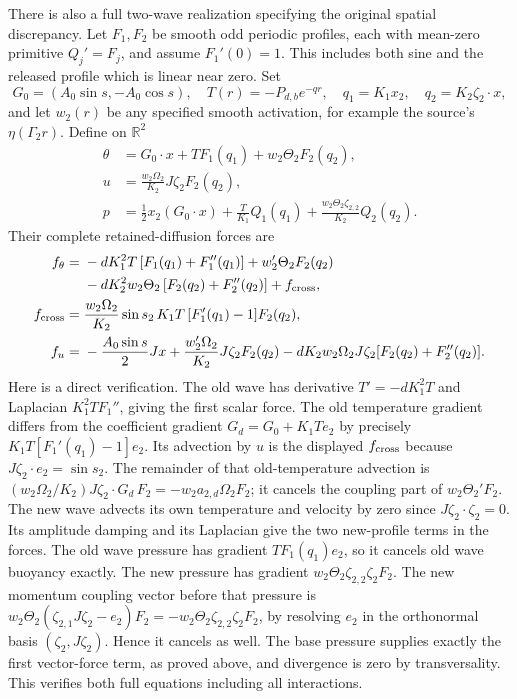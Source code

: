 There is also a full two-wave realization specifying the original
spatial discrepancy. Let $F_1,F_2$ be smooth odd periodic profiles,
each with mean-zero primitive $Q_j'=F_j$, and assume $F_1'(0)=1$.
This includes both sine and the released profile which is linear
near zero. Set
\[
 G_0=(A_0\sin s,-A_0\cos s),\quad
 T(r)=-P_{d,b}e^{-qr},\quad
 q_1=K_1x_2,\quad q_2=K_2\zeta_2\cdot x,
\]
and let $w_2(r)$ be any specified smooth activation, for example
the source's $\eta(\Gamma_2r)$. Define on $\mathbb R^2$
\begin{align}
 \theta&=G_0\cdot x+T F_1(q_1)+w_2\Theta_2F_2(q_2),\nonumber\\
 u&=\frac{w_2\Omega_2}{K_2}J\zeta_2F_2(q_2),\nonumber\\
 p&=\frac12x_2(G_0\cdot x)+\frac{T}{K_1}Q_1(q_1)
          +\frac{w_2\Theta_2\zeta_{2,2}}{K_2}Q_2(q_2).
 \label{cvlane:eq:cv-feedback-spatial-state}
\end{align}
Their complete retained-diffusion forces are
\begin{align}
 f_\theta={}&-dK_1^2T\,[F_1(q_1)+F_1''(q_1)]
 +w_2'\Theta_2F_2(q_2)\nonumber\\
 &-dK_2^2w_2\Theta_2\,[F_2(q_2)+F_2''(q_2)]
 +f_{\rm cross},\label{cvlane:eq:cv-feedback-spatial-scalar-force}\\
 f_{\rm cross}={}&\frac{w_2\Omega_2}{K_2}\sin s_2\,
        K_1T\,[F_1'(q_1)-1]F_2(q_2),
 \label{cvlane:eq:cv-feedback-exact-cross-force}\\
 f_u={}&-\frac{A_0\sin s}2Jx
 +\frac{w_2'\Omega_2}{K_2}J\zeta_2F_2(q_2)
 -dK_2w_2\Omega_2J\zeta_2[F_2(q_2)+F_2''(q_2)].
 \label{cvlane:eq:cv-feedback-spatial-momentum-force}
\end{align}
Here is a direct verification. The old wave has derivative $T'=-dK_1^2T$
and Laplacian $K_1^2TF_1''$, giving the first scalar force.
The old temperature gradient differs from the coefficient gradient
$G_d=G_0+K_1Te_2$ by precisely
$K_1T[F_1'(q_1)-1]e_2$. Its advection by $u$ is the displayed
$f_{\rm cross}$ because $J\zeta_2\cdot e_2=\sin s_2$.
The remainder of that old-temperature advection is
$(w_2\Omega_2/K_2)J\zeta_2\cdot G_d\,F_2=-w_2a_{2,d}\Omega_2F_2$;
it cancels the coupling part of $w_2\Theta_2'F_2$.
The new wave advects its own temperature and velocity by zero since
$J\zeta_2\cdot\zeta_2=0$. Its amplitude damping and its Laplacian
give the two new-profile terms in the forces.
The old wave pressure has gradient $TF_1(q_1)e_2$, so it cancels
old wave buoyancy exactly. The new pressure has gradient
$w_2\Theta_2\zeta_{2,2}\zeta_2F_2$.
The new momentum coupling vector before that pressure is
$w_2\Theta_2(\zeta_{2,1}J\zeta_2-e_2)F_2
=-w_2\Theta_2\zeta_{2,2}\zeta_2F_2$, by resolving $e_2$ in the
orthonormal basis $(\zeta_2,J\zeta_2)$. Hence it cancels as well.
The base pressure supplies exactly the first vector-force term,
as proved above, and divergence is zero by transversality.
This verifies both full equations including all interactions.

